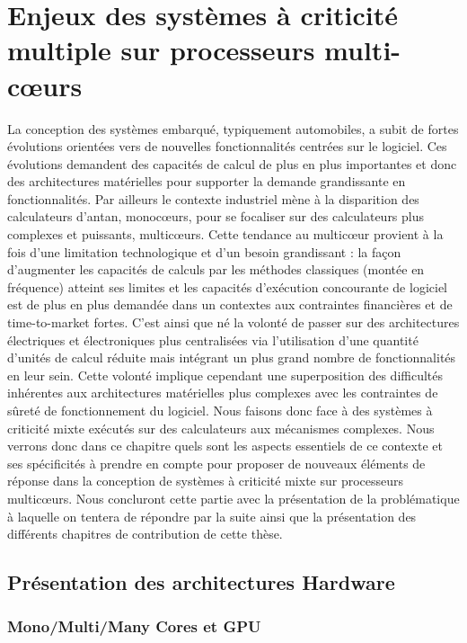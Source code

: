 \documentclass[french, a4paper, 11pt, twoside, pdftex]{StyleThese}
\begin{document}
\setcounter{chapter}{1}
\dominitoc
\faketableofcontents
\fi

\chapter{Enjeux des systèmes à criticité multiple sur processeurs multi-c\oe{}urs}
\minitoc

La conception des systèmes embarqué, typiquement automobiles, a subit de fortes évolutions orientées vers de nouvelles fonctionnalités centrées sur le logiciel. Ces évolutions demandent des capacités de calcul de plus en plus importantes et donc des architectures matérielles pour supporter la demande grandissante en fonctionnalités. Par ailleurs le contexte industriel mène à la disparition des calculateurs d'antan, monoc\oe{}urs, pour se focaliser sur des calculateurs plus complexes et puissants, multic\oe{}urs. Cette tendance au multic\oe{}ur provient à la fois d'une limitation technologique et d'un besoin grandissant : la façon d'augmenter les capacités de calculs par les méthodes classiques (montée en fréquence) atteint ses limites et les capacités d'exécution concourante de logiciel est de plus en plus demandée dans un contextes aux contraintes financières et de time-to-market fortes. C'est ainsi que né la volonté de passer sur des architectures électriques et électroniques plus centralisées via l'utilisation d'une quantité d'unités de calcul réduite mais intégrant un plus grand nombre de fonctionnalités en leur sein. Cette volonté implique cependant une superposition des difficultés inhérentes aux architectures matérielles plus complexes avec les contraintes de sûreté de fonctionnement du logiciel. Nous faisons donc face à des systèmes à criticité mixte exécutés sur des calculateurs aux mécanismes complexes. Nous verrons donc dans ce chapitre quels sont les aspects essentiels de ce contexte et ses spécificités à prendre en compte pour proposer de nouveaux éléments de réponse dans la conception de systèmes à criticité mixte sur processeurs multic\oe{}urs. Nous concluront cette partie avec la présentation de la problématique à laquelle on tentera de répondre par la suite ainsi que la présentation des différents chapitres de contribution de cette thèse.

\section{Présentation des architectures Hardware}
    \subsection{Mono/Multi/Many Cores et GPU}
\end{document}
